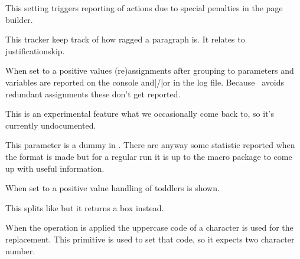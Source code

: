 \stopnewprimitive

\startnewprimitive[title={\prm {tracingpenalties}}]

This setting triggers reporting of actions due to special penalties in the
page builder.

\stopnewprimitive

\startnewprimitive[title={\prm {tracingraggedness}}]

This tracker keep track of how ragged a paragraph is. It relates to \prm
{justificationskip}.

\stopnewprimitive

\startoldprimitive[title={\prm {tracingrestores}}]

When set to a positive values (re)assignments after grouping to parameters and
variables are reported on the console and|/|or in the log file. Because
\LUAMETATEX\ avoids redundant assignments these don't get reported.

\stopoldprimitive

\startnewprimitive[title={\prm {tracingsnapping}}]

This is an experimental feature what we occasionally come back to, so it's
currently undocumented.

\stopnewprimitive

\startoldprimitive[title={\prm {tracingstats}}]

This parameter is a dummy in \LUAMETATEX. There are anyway some statistic
reported when the format is made but for a regular run it is up to the macro
package to come up with useful information.

\stopoldprimitive

\startnewprimitive[title={\prm {tracingtoddlers}}]

When set to a positive value handling of toddlers is shown.

\stopnewprimitive

\startnewprimitive[title={\prm {tsplit}}]

This splits like  but it returns a  box instead.

\stopnewprimitive

\startoldprimitive[title={\prm {uccode}}]

When the  operation is applied the uppercase code of a character
is used for the replacement. This primitive is used to set that code, so it
expects two character number.

\stopoldprimitive

\startoldprimitive[title={\prm {uchyph}}]


